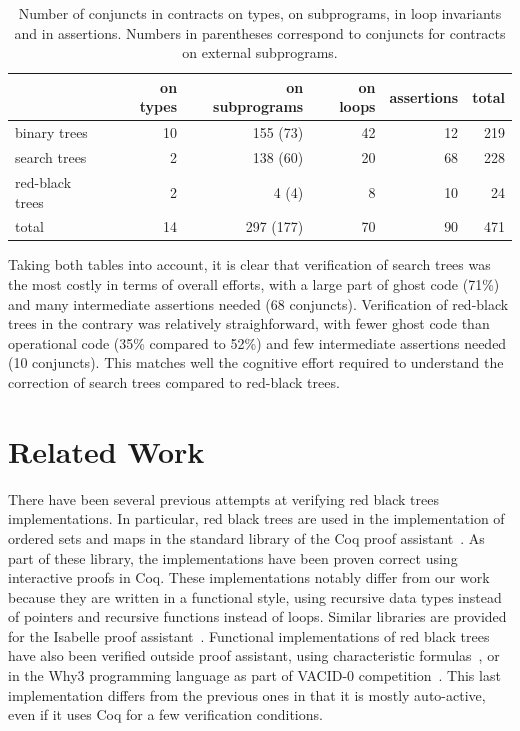 \documentclass[11pt,a4paper]{article}
\begin{document}
\begin{table}[h]
\begin{center}
\begin{tabular}{l|rrrr|r}
                & on types & on subprograms & on loops & assertions & total \\ \hline
binary trees    & 10       & 155 (73)       & 42       & 12         & 219 \\
search trees    & 2        & 138 (60)       & 20       & 68         & 228 \\
red-black trees & 2        & 4 (4)          & 8        & 10         & 24 \\ \hline
total           & 14       & 297 (177)      & 70       & 90         & 471
\end{tabular}
\caption{\label{tab-sloc2} Number of conjuncts in contracts on types, on
  subprograms, in loop invariants and in assertions. Numbers in parentheses
  correspond to conjuncts for contracts on external subprograms.}
\end{center}
\end{table}

Taking both tables into account, it is clear that verification of search trees
was the most costly in terms of overall efforts, with a large part of ghost
code (71\%) and many intermediate assertions needed (68
conjuncts). Verification of red-black trees in the contrary was relatively
straighforward, with fewer ghost code than operational code (35\% compared to
52\%) and few intermediate assertions needed (10 conjuncts). This matches well
the cognitive effort required to understand the correction of search trees
compared to red-black trees.

\section{Related Work}
\label{related-work}
There have been several previous attempts at verifying red black trees implementations. In particular, red black trees are
used in the implementation of ordered sets and maps in the standard library of the Coq proof
assistant~\cite{filliatre2004functors,appel2011efficient}. As part of these library, the implementations have been proven
correct using interactive proofs in Coq. These implementations notably differ from our work because they are written in
a functional style, using recursive data types instead of pointers and recursive functions instead of loops. Similar
libraries are provided for the Isabelle proof assistant~\cite{lammich2010isabelle}. Functional implementations of
red black trees have also been verified outside proof assistant, using characteristic formulas~\cite{chargueraud2010program},
or in the Why3 programming language as part of VACID-0 competition~\cite{leino2010vacid}. This last implementation differs from
the previous ones in that it is mostly auto-active, even if it uses Coq for a few verification conditions.
\end{document}

